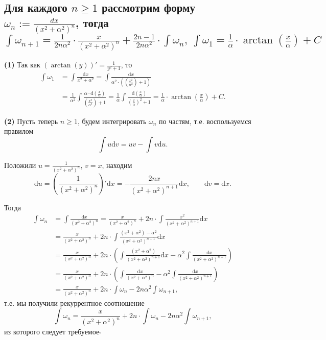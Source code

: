 \documentclass[a4paper]{article}
\newcommand{\qed}{\hfill$\square$}
\begin{document}
\subsection{Для каждого $n\geqslant1$ рассмотрим форму $\omega_n:=\displaystyle\frac{dx}{(x^2+\alpha^2)^n}$, тогда $\displaystyle\int\omega_{n+1}=\frac{1}{2n\alpha^2}\cdot\frac{x}{(x^2+\alpha^2)^n}+\frac{2n-1}{2n\alpha^2}\cdot\int\omega_{n},\ \int\omega_1=\frac{1}{\alpha}\cdot\arctan{\left(\frac{x}{\alpha}\right)}+C$}
\label{2.9}
\indent\textbf{(1) }Так как $(\arctan(y))' = \displaystyle\frac{1}{y^2 + 1}$, то
$$\begin{aligned}
\int \omega_1 &= \int \frac{\mathrm{d}x}{x^2 + \alpha^2}  = \int \frac{\mathrm{d}x}{\alpha^2\cdot\left (\left( \frac{x^2}{\alpha^2} \right) + 1\right)}\\
&= \frac{1}{\alpha^2} \int \frac{\alpha \cdot\mathrm{d}\left(\frac{x}{\alpha}\right)}{\left( \frac{x^2}{\alpha^2} \right) + 1} = \frac{1}{\alpha} \int \frac{ \mathrm{d}\left(\frac{x}{\alpha}\right)}{\left( \frac{x}{\alpha} \right)^2 + 1} = \frac{1}{\alpha} \cdot \arctan\left( \frac{x}{\alpha}\right) + C.
\end{aligned}$$

\indent\textbf{(2) }Пусть теперь $n \geqslant 1$, будем интегрировать $\omega_n$ по частям, т.е. воспользуемся правилом
$$
\int u \mathrm{d}v = uv - \int v \mathrm{d}u.
$$

Положили $u = \frac{1}{(x^2 + \alpha^2)^n}$, $v = x$, находим
$$
\mathrm{d}u = \left( \frac{1}{(x^2 + \alpha^2)^n} \right)'\mathrm{d}x = - \frac{2nx}{(x^2 + \alpha^2)^{n+1}}\mathrm{d}x, \qquad \mathrm{d}v = \mathrm{d}x.
$$

Тогда
$$\begin{aligned}
\int \omega_n &= \int \frac{\mathrm{d}x}{(x^2 + \alpha^2)^n} = \frac{x}{(x^2 + \alpha^2)^n} + 2n \cdot \int \frac{x^2}{(x^2 + \alpha^2)^{n+1}}\mathrm{d}x \\
&= \frac{x}{(x^2 + \alpha^2)^n} + 2n \cdot \int \frac{(x^2+\alpha^2) - \alpha^2}{(x^2 + \alpha^2)^{n+1}}\mathrm{d}x \\
&= \frac{x}{(x^2 + \alpha^2)^n} + 2n \cdot \left( \int \frac{(x^2+\alpha^2)}{(x^2 + \alpha^2)^{n+1}}\mathrm{d}x - \alpha^2 \int  \frac{\mathrm{d}x}{(x^2 + \alpha^2)^{n+1}}\right) \\
&= \frac{x}{(x^2 + \alpha^2)^n} + 2n \cdot \left( \int \frac{\mathrm{d}x}{(x^2 + \alpha^2)^{n}} - \alpha^2 \int  \frac{\mathrm{d}x}{(x^2 + \alpha^2)^{n+1}}\right) \\
&=\frac{x}{(x^2 + \alpha^2)^n} + 2n\cdot \int \omega_n  - 2n\alpha^2 \int \omega_{n+1},
\end{aligned}$$
т.е. мы получили рекуррентное соотношение 
$$
\int \omega_n = \frac{x}{(x^2 + \alpha^2)^n} + 2n\cdot \int \omega_n  - 2n\alpha^2 \int \omega_{n+1},
$$
из которого следует требуемое\qed
\end{document}
